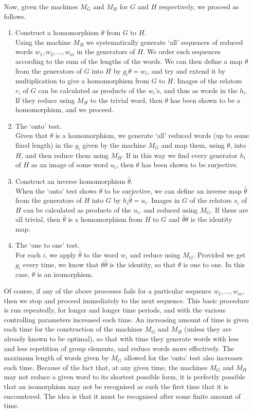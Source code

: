 Now, given the machines $M_G$ and $M_H$ for $G$ and $H$ respectively,
we proceed as follows.
\begin{enumerate}
\item 
Construct a homomorphism $\theta$ from $G$ to $H$.\\
Using the machine $M_H$ we systematically
generate `all' sequences of reduced words
$w_1, w_2, \ldots , w_m$ in the generators of $H$.
We order such sequences
according to the sum of the lengths of the
words. We can then define a map $\theta$ from  the generators 
of $G$ into $H$ by $g_i\theta = w_i$, and try and extend it by
multiplication to give a homomorphism from $G$ to $H$.   
Images of the relators $r_i$ of $G$ can be calculated as
products of the $w_i$'s, and thus as words in the $h_i$.
If they reduce using $M_H$
to the trivial word, then $\theta$ has been shown to be a homomorphism, and
we proceed.
\item 
The `onto' test.\\
Given that $\theta$ is a homomorphism, we generate `all'
reduced words (up to some fixed length) in the $g_i$
given by the machine $M_G$ and map them, using $\theta$, into $H$, and then
reduce them using  $M_H$. If in
this way we find every generator $h_i$ of $H$ as an image of some word
$u_i$, then $\theta$ has been shown to be surjective.
\item
Construct an inverse homomorphism $\hat{\theta}$.\\
When the `onto' test shows $\theta$ to be surjective, we can define an
inverse map $\hat{\theta}$ from the generators of $H$ into $G$ by 
$h_i\hat{\theta} = u_i$. Images in $G$ of the relators $s_i$ of $H$ can be
calculated as products of the $u_i$, and reduced using $M_G$. If these are
all trivial, then $\hat{\theta}$ is a homomorphism from $H$ to $G$ and
$\hat{\theta}\theta$ is the identity map. 
\item 
The `one to one' test.\\
For each $i$, we apply $\hat{\theta}$ to the word $w_i$ and reduce
using $M_G$. Provided we get $g_i$ every time, we know that
$\theta\hat{\theta}$ is the identity, so that $\theta$ is one to one.
In this case, $\theta$ is an isomorphism.
\end{enumerate}
Of course, if any of the above processes fails for a particular sequence
$w_1, \ldots ,w_m$, then we stop and proceed immediately to the next
sequence.
This basic procedure is run repeatedly, for longer and longer time periods,
and with the various controlling
parameters increased each time.  An increasing amount of time is given each
time for the construction of the machines  $M_G$ and $M_H$ (unless they are
already known to be optimal), so that with
time they generate words with less and less repetition of group elements,
and reduce words more effectively.
The maximum length of words given by $M_G$ allowed for the
`onto' test also increases each time. 
Because of the fact that, at any given time, the machines  $M_G$ and $M_H$
may not reduce a given word to its shortest possible form,
it is perfectly possible that an
isomorphism may not be recognised as such the first time that it is
encountered. The idea is that it must be recognised after some finite amount
of time.

